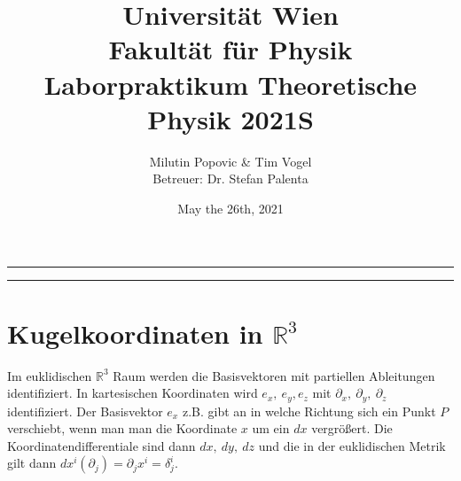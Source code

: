 \documentclass[a4paper]{article}
\title{Universität Wien\\ Fakultät für Physik\\
\vspace{1.25cm}Laborpraktikum Theoretische Physik 2021S \\
}
\author{Milutin Popovic \& Tim Vogel \vspace{1cm}\\ Betreuer: Dr. Stefan
Palenta}
\date{May the 26th, 2021}
\begin{document}
\maketitle
\noindent\rule[0.5ex]{\linewidth}{1pt}
\begin{abstract}
\end{abstract}
\noindent\rule[0.5ex]{\linewidth}{1pt}

\tableofcontents
\section{Kugelkoordinaten in $\mathbb{R}^3$}
Im euklidischen $\mathbb{R}^3$ Raum werden die Basisvektoren mit partiellen
Ableitungen identifiziert. In kartesischen Koordinaten wird $e_x,\ e_y, e_z$
mit $\partial _x,\ \partial _y,\ \partial _z$ identifiziert. Der
Basisvektor $e_x$ z.B. gibt an in welche Richtung sich ein Punkt $P$
verschiebt, wenn man man die Koordinate $x$ um ein $dx$ vergrößert. Die
Koordinatendifferentiale sind dann $dx,\ dy,\ dz$ und die in der euklidischen
Metrik gilt dann $dx^i(\partial _j) = \partial_j x^i = \delta^i_j$.
\end{document}
